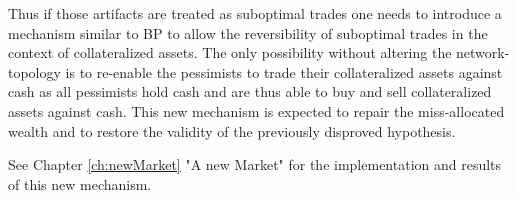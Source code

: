 \documentclass[Bachelorarbeit.tex]{subfiles}
\begin{document}
\medskip 

Thus if those artifacts are treated as suboptimal trades one needs to introduce a mechanism similar to BP to allow the reversibility of suboptimal trades in the context of collateralized assets. The only possibility without altering the network-topology is to re-enable the pessimists to trade their collateralized assets against cash as all pessimists hold cash and are thus able to buy and sell collateralized assets against cash. This new mechanism is expected to repair the miss-allocated wealth and to restore the validity of the previously disproved hypothesis.

\medskip 

See Chapter \ref{ch:newMarket} "A new Market" for the implementation and results of this new mechanism.
\end{document}
